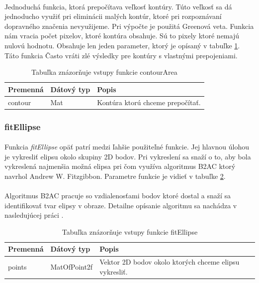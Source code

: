 \documentclass[12pt]{article}
\begin{document}
\paragraph{}
Jednoduchá funkcia, ktorá prepočítava veľkosť kontúry.
Túto veľkosť sa dá jednoducho využiť pri eliminácii malých kontúr, ktoré pri rozpoznávaní dopravného značenia nevyužijeme.
Pri výpočte je použitá Greenová veta. Funkcia nám vracia počet pixelov, ktoré kontúra obsahuje. Sú to pixely ktoré nemajú nulovú hodnotu.
Obsahuje len jeden parameter, ktorý je opísaný v tabuľke \ref{contourAreaPar}. Táto funkcia Často vráti zlé výsledky pre kontúry s vlastnými prepojeniami.
\cite{OpenCVDoc}
\begin{table}
	\centering
    \begin{tabular}{ | l | l | p{5cm} |}
    \hline
    Premenná & Dátový typ & Popis \\ \hline
    contour & Mat & Kontúra ktorú chceme prepočítať. \\ 
    \hline
    \end{tabular}
  	\caption{Tabuľka znázorňuje vstupy funkcie contourArea}
  	\label{contourAreaPar}
\end{table}
\subsubsection{fitEllipse}
\paragraph{}
Funkcia \emph{fitEllipse} opäť patrí medzi ľahšie použiteľné funkcie. Jej hlavnou úlohou je vykresliť elipsu okolo skupiny 2D bodov.
Pri vykreslení sa snaží o to, aby bola vykreslená najmenšia možná elipsa pri čom využíva algoritmus B2AC ktorý navrhol Andrew W. Fitzgibbon.
Parametre funkcie je vidieť v tabuľke \ref{fitEllipsePar}.\cite{OpenCVDoc}
\paragraph{}
Algoritmus B2AC pracuje so vzdialenosťami bodov ktoré dostal a snaží sa identifikovať tvar elipsy v obraze. Detailne opísanie algoritmu sa nachádza v nasledujúcej práci \cite{fitzgibbo95}.
\begin{table}
	\centering
    \begin{tabular}{ | l | l | p{5cm} |}
    \hline
    Premenná & Dátový typ & Popis \\ \hline
    points & MatOfPoint2f & Vektor 2D bodov okolo ktorých chceme elipsu vykresliť. \\ 
    \hline
    \end{tabular}
  	\caption{Tabuľka znázorňuje vstupy funkcie fitEllipse}
  	\label{fitEllipsePar}
\end{table}
\end{document}
